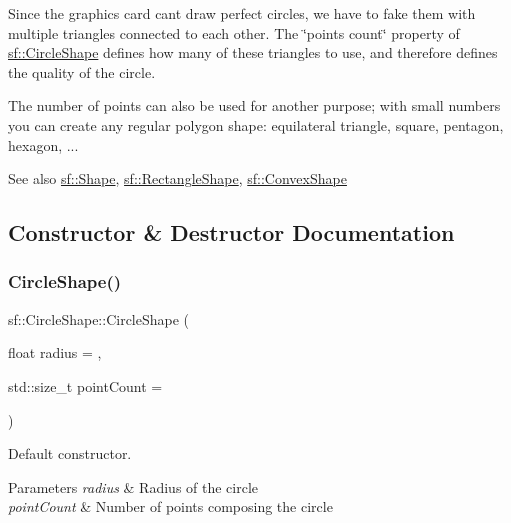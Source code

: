 Since the graphics card can\textquotesingle{}t draw perfect circles, we have to fake them with multiple triangles connected to each other. The \char`\"{}points count\char`\"{} property of \mbox{\hyperlink{classsf_1_1_circle_shape}{sf\+::\+Circle\+Shape}} defines how many of these triangles to use, and therefore defines the quality of the circle.

The number of points can also be used for another purpose; with small numbers you can create any regular polygon shape\+: equilateral triangle, square, pentagon, hexagon, ...

\begin{DoxySeeAlso}{See also}
\mbox{\hyperlink{classsf_1_1_shape}{sf\+::\+Shape}}, \mbox{\hyperlink{classsf_1_1_rectangle_shape}{sf\+::\+Rectangle\+Shape}}, \mbox{\hyperlink{classsf_1_1_convex_shape}{sf\+::\+Convex\+Shape}} \begin{DoxyVerb}\end{DoxyVerb}
 
\end{DoxySeeAlso}


\subsection{Constructor \& Destructor Documentation}
\mbox{\label{classsf_1_1_circle_shape_aaebe705e7180cd55588eb19488af3af1}} 
\subsubsection{\texorpdfstring{CircleShape()}{CircleShape()}}
{\footnotesize\ttfamily sf\+::\+Circle\+Shape\+::\+Circle\+Shape (\begin{DoxyParamCaption}\item[{float}]{radius = {},  }\item[{std\+::size\+\_\+t}]{point\+Count = {} }\end{DoxyParamCaption})\hspace{0.3cm}{\ttfamily [explicit]}}



Default constructor. 


\begin{DoxyParams}{Parameters}
{\em radius} & Radius of the circle \\
\hline
{\em point\+Count} & Number of points composing the circle \begin{DoxyVerb}\end{DoxyVerb}
 \\
\hline
\end{DoxyParams}


